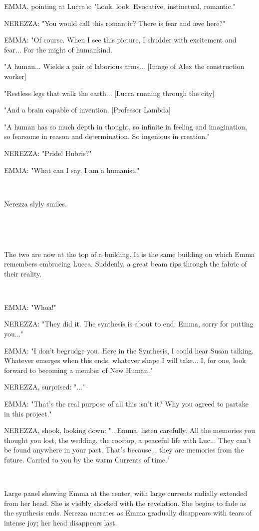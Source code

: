 \documentclass[11pt]{article}
\begin{document}
EMMA, pointing at Lucca's: "Look, look. Evocative, instinctual, romantic."

NEREZZA: "You would call this romantic? There is fear and awe here?"

EMMA: "Of course. 
When I see this picture, I shudder with excitement and fear...
For the might of humankind.

"A human... Wields a pair of laborious arms... [Image of Alex the construction worker]

"Restless legs that walk the earth... [Lucca running through the city]

"And a brain capable of invention. [Professor Lambda]

"A human has so much depth in thought,
so infinite in feeling and imagination,
so fearsome in reason and determination.
So ingenious in creation."

NEREZZA: "Pride! Hubris?"

EMMA: "What can I say, I am a humanist."

\ 

Nerezza slyly smiles.

\ 

\ 

The two are now at the top of a building.
It is the same building on which Emma remembers embracing Lucca. 
Suddenly, a great beam rips through the fabric of their reality.

\ 

EMMA: "Whoa!"

NEREZZA: "They did it. 
The synthesis is about to end.
Emma, sorry for putting you..."

EMMA: "I don't begrudge you. 
Here in the Synthesis, I could hear Susan talking.
Whatever emerges when this ends, whatever shape I will take...
I, for one, look forward to becoming a member of New Human."

NEREZZA, surprised: "..."

EMMA: "That's the real purpose of all this isn't it?
Why you agreed to partake in this project."

NEREZZA, shook, looking down: "...Emma, listen carefully.
All the memories you thought you lost, the wedding, the rooftop, a peaceful life with Luc... They can't be found anywhere in your past. 
That's because... they are memories from the future.
Carried to you by the warm Currents of time."

\ 

Large panel showing Emma at the center, with large currents radially extended from her head.
She is visibly shocked with the revelation.
She begins to fade as the synthesis ends. 
Nerezza narrates as Emma gradually disappears with tears of intense joy; her head disappears last.
\end{document}
